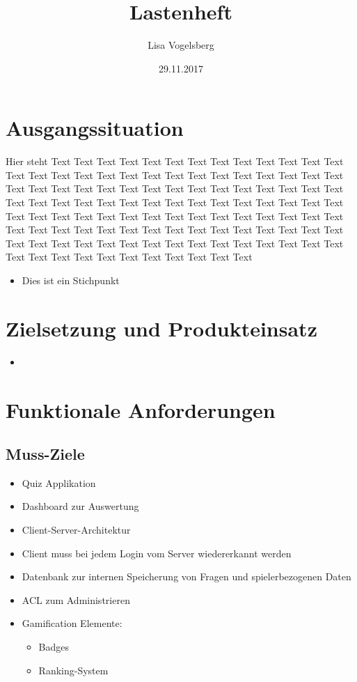 \documentclass[11pt,a4paper]{scrreprt}
\title{Lastenheft}
\author{Lisa Vogelsberg}
\date{29.11.2017}
\begin{document}
\tableofcontents
\chapter{Ausgangssituation}
Hier steht Text Text Text Text Text Text Text Text Text Text Text Text Text Text Text Text Text Text Text Text Text Text Text Text Text Text Text Text Text Text Text Text Text Text Text Text Text Text Text Text Text Text Text Text Text Text Text Text Text Text Text Text Text Text Text Text Text Text Text Text Text Text Text Text Text Text Text Text Text Text Text Text Text Text Text Text Text Text Text Text Text Text Text Text Text Text Text Text Text Text Text Text Text Text Text Text Text Text Text Text Text Text Text Text Text Text Text Text Text Text Text Text Text Text
\begin{itemize}
\item Dies ist ein Stichpunkt
\end{itemize}
\chapter{Zielsetzung und Produkteinsatz}
\begin{itemize}
\item
\end{itemize}
\chapter{Funktionale Anforderungen}
\section{Muss-Ziele}
\begin{itemize}
\item Quiz Applikation
\item Dashboard zur Auswertung
\item Client-Server-Architektur
\item Client muss bei jedem Login vom Server wiedererkannt werden
\item Datenbank zur internen Speicherung von Fragen und spielerbezogenen Daten
\item ACL zum Administrieren
\item Gamification Elemente:
\begin{itemize}
\item Badges
\item Ranking-System
\end{itemize}
\end{itemize}
\end{document}
